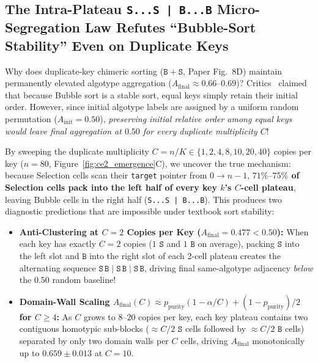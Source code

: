 \documentclass[11pt,a4paper]{article}
\theoremstyle{definition}
\theoremstyle{remark}
\begin{document}
\subsection{The Intra-Plateau \texttt{S...S | B...B} Micro-Segregation Law Refutes ``Bubble-Sort Stability'' Even on Duplicate Keys}

Why does duplicate-key chimeric sorting ($\mathtt{B+S}$, Paper Fig.~8D) maintain permanently elevated algotype aggregation ($A_{\mathrm{final}} \approx 0.66\text{--}0.69$)? Critics~\cite{Sweet2026} claimed that because Bubble sort is a stable sort, equal keys simply retain their initial order. However, since initial algotype labels are assigned by a uniform random permutation ($A_{\mathrm{init}} = 0.50$), \emph{preserving initial relative order among equal keys would leave final aggregation at $0.50$ for every duplicate multiplicity $C$}!

By sweeping the duplicate multiplicity $C = n / K \in \{1, 2, 4, 8, 10, 20, 40\}$ copies per key ($n = 80$, Figure~\ref{fig:ce2_emergence}C), we uncover the true mechanism: because Selection cells scan their \texttt{target} pointer from $0 \to n-1$, \textbf{$71\%\text{--}75\%$ of Selection cells pack into the left half of every key $k$'s $C$-cell plateau}, leaving Bubble cells in the right half (\texttt{S...S | B...B}). This produces two diagnostic predictions that are impossible under textbook sort stability:
\begin{itemize}
  \item \textbf{Anti-Clustering at $C = 2$ Copies per Key ($A_{\mathrm{final}} = 0.477 < 0.50$):} When each key has exactly $C = 2$ copies ($1$ $\mathtt{S}$ and $1$ $\mathtt{B}$ on average), packing $\mathtt{S}$ into the left slot and $\mathtt{B}$ into the right slot of each 2-cell plateau creates the alternating sequence $\mathtt{S\,B \mid S\,B \mid S\,B}$, driving final same-algotype adjacency \emph{below} the $0.50$ random baseline!
  \item \textbf{Domain-Wall Scaling $A_{\mathrm{final}}(C) \approx p_{\mathrm{purity}}(1 - \alpha/C) + (1-p_{\mathrm{purity}})/2$ for $C \ge 4$:} As $C$ grows to $8\text{--}20$ copies per key, each key plateau contains two contiguous homotypic sub-blocks ($\approx C/2$ $\mathtt{S}$ cells followed by $\approx C/2$ $\mathtt{B}$ cells) separated by only two domain walls per $C$ cells, driving $A_{\mathrm{final}}$ monotonically up to $\mathbf{0.659 \pm 0.013}$ at $C = 10$.
\end{itemize}

\end{document}
